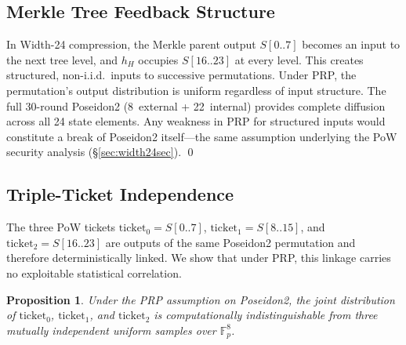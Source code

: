 \documentclass[11pt,a4paper]{article}
\newtheorem{proposition}{Proposition}
\begin{document}
\subsection{Merkle Tree Feedback Structure}

In Width-24 compression, the Merkle parent output $S[0..7]$ becomes an input to the next tree level, and $h_H$ occupies $S[16..23]$ at every level. This creates structured, non-i.i.d.\ inputs to successive permutations. Under PRP, the permutation's output distribution is uniform regardless of input structure. The full 30-round Poseidon2 (8~external + 22~internal) provides complete diffusion across all 24 state elements. Any weakness in PRP for structured inputs would constitute a break of Poseidon2 itself---the same assumption underlying the PoW security analysis (\S\ref{sec:width24sec}). \qed

\subsection{Triple-Ticket Independence}
\label{app:triple-ticket}

The three PoW tickets $\mathrm{ticket}_0 = S[0..7]$, $\mathrm{ticket}_1 = S[8..15]$, and $\mathrm{ticket}_2 = S[16..23]$ are outputs of the same Poseidon2 permutation and therefore deterministically linked. We show that under PRP, this linkage carries no exploitable statistical correlation.

\begin{proposition}
Under the PRP assumption on Poseidon2, the joint distribution of $\mathrm{ticket}_0$, $\mathrm{ticket}_1$, and $\mathrm{ticket}_2$ is computationally indistinguishable from three mutually independent uniform samples over $\mathbb{F}_p^8$.
\end{proposition}
\end{document}
